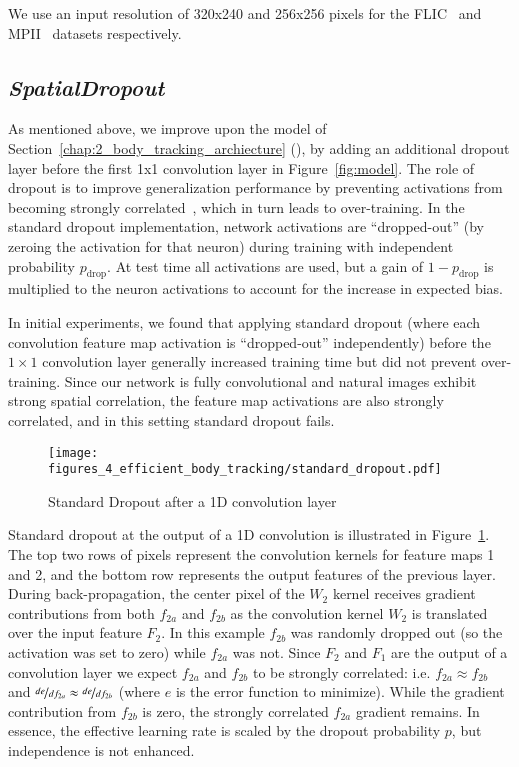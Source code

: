 We use an input resolution of 320x240 and 256x256 pixels for the FLIC~\cite{modec} and MPII~\cite{andriluka14cvpr} datasets respectively.

\subsection{\textbf{\textit{SpatialDropout}}}
\label{sec:spatialdropout}

As mentioned above, we improve upon the model of Section~\ref{chap:2_body_tracking_archiecture} (\cite{tompsonnips2014}), by adding an additional dropout layer before the first 1x1 convolution layer in Figure~\ref{fig:model}. The role of dropout is to improve generalization performance by preventing activations from becoming strongly correlated~\cite{hinton2012improving}, which in turn leads to over-training. In the standard dropout implementation, network activations are ``dropped-out'' (by zeroing the activation for that neuron) during training with independent probability $p_{\text{drop}}$. At test time all activations are used, but a gain of $1-p_{\text{drop}}$ is multiplied to the neuron activations to account for the increase in expected bias.

In initial experiments, we found that applying standard dropout (where each convolution feature map activation is ``dropped-out'' independently) before the $1\times1$ convolution layer generally increased training time but did not prevent over-training. Since our network is fully convolutional and natural images exhibit strong spatial correlation, the feature map activations are also strongly correlated, and in this setting standard dropout fails. 

\begin{figure}[ht]
\centering
\texttt{[image: figures\_4\_efficient\_body\_tracking/standard\_dropout.pdf]}
   \caption{Standard Dropout after a 1D convolution layer}
\label{fig:dropout}
\end{figure}

Standard dropout at the output of a 1D convolution is illustrated in Figure~\ref{fig:dropout}. The top two rows of pixels represent the convolution kernels for feature maps 1 and 2, and the bottom row represents the output features of the previous layer. During back-propagation, the center pixel of the $W_2$ kernel receives gradient contributions from both $f_{2a}$ and $f_{2b}$ as the convolution kernel $W_2$ is translated over the input feature $F_2$. In this example $f_{2b}$ was randomly dropped out (so the activation was set to zero) while $f_{2a}$ was not. Since $F_2$ and $F_1$ are the output of a convolution layer we expect $f_{2a}$ and $f_{2b}$ to be strongly correlated: i.e. $f_{2a}\approx f_{2b}$ and $\nicefrac{de}{df_{2a}}\approx \nicefrac{de}{df_{2b}}$ (where $e$ is the error function to minimize). While the gradient contribution from $f_{2b}$ is zero, the strongly correlated $f_{2a}$ gradient remains. In essence, the effective learning rate is scaled by the dropout probability $p$, but independence is not enhanced.

